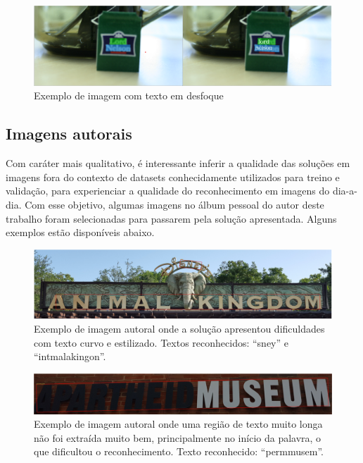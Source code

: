 \begin{figure}
    \centering
    \includegraphics[width=\textwidth]{figs/resultados-icdar13-04.png}
    \caption{Exemplo de imagem com texto em desfoque}
    \label{fig:results_icdar13_04}
\end{figure}


\subsection{Imagens autorais}\label{sec:results_own_images}

Com caráter mais qualitativo, é interessante inferir a qualidade das soluções em imagens fora do contexto de datasets conhecidamente utilizados para treino e validação, para experienciar a qualidade do reconhecimento em imagens do dia-a-dia. Com esse objetivo, algumas imagens no álbum pessoal do autor deste trabalho foram selecionadas para passarem pela solução apresentada. Alguns exemplos estão disponíveis abaixo.

\begin{figure}
    \centering
    \includegraphics[width=\textwidth]{figs/resultados-autoral-01.png}
    \caption{Exemplo de imagem autoral onde a solução apresentou dificuldades com texto curvo e estilizado. Textos reconhecidos: “sney” e “intmalakingon”.}
    \label{fig:results_own_images_01}
\end{figure}

\begin{figure}
    \centering
    \includegraphics[width=\textwidth]{figs/resultados-autoral-02.png}
    \caption{Exemplo de imagem autoral onde uma região de texto muito longa não foi extraída muito bem, principalmente no início da palavra, o que dificultou o reconhecimento. Texto reconhecido: “permmusem”.}
    \label{fig:results_own_images_02}
\end{figure}

